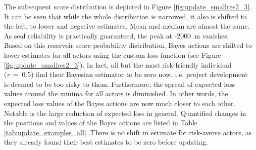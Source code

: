 				The subsequent score distribution is depicted in Figure \ref{fig:update_smallres2_3}. It can be seen that while the whole distribution is narrowed, it also is shifted to the left, to lower and negative estimates. Mean and median are almost the same. As seal reliability is practically guaranteed, the peak at -2000~m vanishes.\\				
				Based on this reservoir score probability distribution, Bayes actions are shifted to lower estimates for all actors using the custom loss function (see Figure \ref{fig:update_smallres2_3}). In fact, all but the most risk-friendly individual (\textit{r}~=~0.5) find their Bayesian estimator to be zero now, i.e. project development is deemed to be too risky to them. Furthermore, the spread of expected loss values around the minima for all actors is diminished. In other words, the expected loss values of the Bayes actions are now much closer to each other. Notable is the large reduction of expected loss in general. Quantified changes in the positions and values of the Bayes actions are listed in Table \ref{tab:update_examples_all}. There is no shift in estimate for risk-averse actors, as they already found their best estimates to be zero before updating.\\
				

